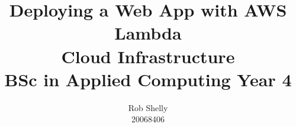 \documentclass[a4paper]{article}
\title{Deploying a Web App with AWS Lambda \\ \small{Cloud Infrastructure \\ BSc in Applied Computing Year 4}}
\author{Rob Shelly \\ \small{20068406}}
\begin{document}
  \maketitle
  \thispagestyle{empty} %
  
  \newpage
  \tableofcontents
  
  \newpage

  
  
  
  
  
  
  
  \newpage
  \renewcommand*{\bibfont}{\raggedright}
  
  
  
  \begin{appendices}
    
  \end{appendices}
  
  
\end{document}
